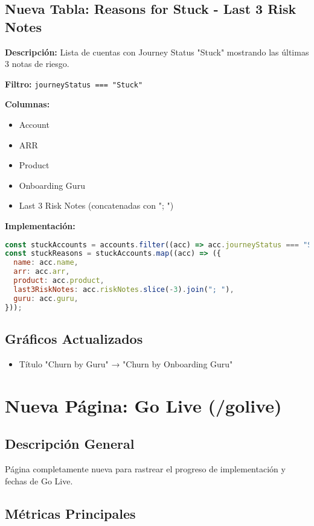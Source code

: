 \documentclass[12pt,a4paper]{article}
\begin{document}
\subsection{Nueva Tabla: Reasons for Stuck - Last 3 Risk Notes}

\textbf{Descripción:} Lista de cuentas con Journey Status "Stuck" mostrando las últimas 3 notas de riesgo.

\textbf{Filtro:} \texttt{journeyStatus === "Stuck"}

\textbf{Columnas:}
\begin{itemize}
    \item Account
    \item ARR
    \item Product
    \item Onboarding Guru
    \item Last 3 Risk Notes (concatenadas con "; ")
\end{itemize}

\textbf{Implementación:}
\begin{lstlisting}[language=JavaScript]
const stuckAccounts = accounts.filter((acc) => acc.journeyStatus === "Stuck");
const stuckReasons = stuckAccounts.map((acc) => ({
  name: acc.name,
  arr: acc.arr,
  product: acc.product,
  last3RiskNotes: acc.riskNotes.slice(-3).join("; "),
  guru: acc.guru,
}));
\end{lstlisting}

\subsection{Gráficos Actualizados}
\begin{itemize}
    \item Título "Churn by Guru" → "Churn by Onboarding Guru"
\end{itemize}

\section{Nueva Página: Go Live (/golive)}

\subsection{Descripción General}
Página completamente nueva para rastrear el progreso de implementación y fechas de Go Live.

\subsection{Métricas Principales}
\end{document}
